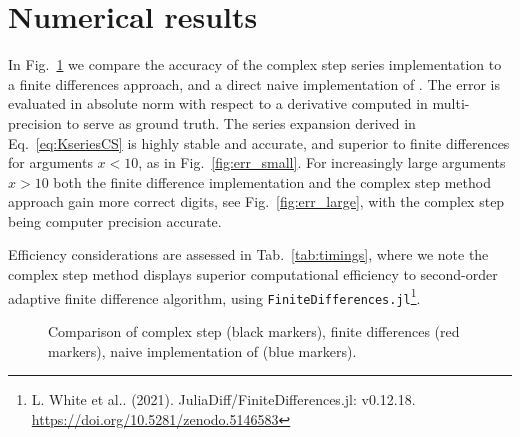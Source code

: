 \documentclass{article}
\begin{document}
\section{Numerical results}\label{sec:results}
In Fig.~\ref{fig:accuracy} we compare the accuracy of the complex step series implementation to a finite differences approach, and a direct naive  implementation of \cite[Eq.:10.38.2]{NIST}. The error is evaluated in absolute norm with  respect to a derivative computed in multi-precision to serve as ground truth. %
The series expansion derived in Eq.~\ref{eq:KseriesCS} is highly stable and accurate, and superior to finite differences for arguments $x<10$, as in Fig.~\ref{fig:err_small}. For increasingly large arguments $x>10$ both the finite difference implementation and the complex step method approach gain more correct digits, see Fig.~\ref{fig:err_large}, with the complex step being computer precision accurate.

Efficiency considerations are assessed in Tab.~\ref{tab:timings}, where we note the complex step method displays superior computational efficiency to second-order adaptive finite difference algorithm, using  \texttt{FiniteDifferences.jl}\footnote{L. White et al.. (2021). JuliaDiff/FiniteDifferences.jl: v0.12.18. \url{https://doi.org/10.5281/zenodo.5146583}}.  %


\begin{figure}[!ht]
\centering {}
\quad {}
\caption{Comparison of complex step (black markers), finite differences (red markers), naive implementation of \cite[Eq.:10.38.2]{NIST} (blue markers).}\label{fig:accuracy}
\end{figure}
\end{document}
